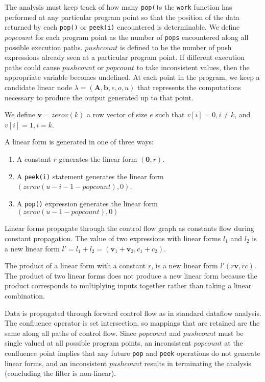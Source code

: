 The analysis must keep track of how many {\tt pop()}s the {\tt work}
function has performed at any particular program point so that the
position of the data returned by each {\tt pop()} or {\tt peek(i)}
encountered is determinable. We define $popcount$ for each program
point as the number of {\tt pops} encountered along all possible
execution paths.  $pushcount$ is defined to be the number of push
expressions already seen at a particular program point.  If different
execution paths could cause $pushcount$ or $popcount$ to take
inconsistent values, then the appropriate variable becomes undefined.
At each point in the program, we keep a candidate linear node
$\lambda=({\mathbf A}, {\mathbf b}, e,o,u)$ that represents the
computations necessary to produce the output generated up to that
point.

We define ${\mathbf v} = zerov(k)$ a row vector of size $e$ such that
$v[i]=0, i \neq k$, and $v[i]=1,i=k$.

A linear form is generated in one of three ways:

\begin{enumerate}
\item A constant $r$ generates the linear form $({\mathbf 0},r)$. 
\vspace{-6pt}

\item A {\tt peek(i)} statement generates the linear form 
$(zerov(u-i-1-popcount), 0)$.
\vspace{-6pt}

\item A {\tt pop()} expression generates the linear form 
$(zerov(u-1-popcount),0)$

\end{enumerate}

Linear forms propagate through the control flow graph as constants
flow during constant propagation. The value of two expressions with
linear forms $l_1$ and $l_2$ is a new linear form
$l'=l_1+l_2=({\mathbf v}_1+{\mathbf v}_2, c_1+c_2)$.

The product of a linear form with a constant $r$, is a new linear form
$l' (r{\mathbf v},rc)$. The product of two linear forms does not
produce a new linear form because the product corresponds to
multiplying inputs together rather than taking a linear combination.

Data is propagated through forward control flow as in standard
dataflow analysis.  The confluence operator is set intersection, so
mappings that are retained are the same along all paths of control
flow. Since $popcount$ and $pushcount$ must be single valued at all
possible program points, an inconsistent $popcount$ at the confluence
point implies that any future {\tt pop} and {\tt peek} operations do
not generate linear forms, and an inconsistent $pushcount$ results in
terminating the analysis (concluding the filter is non-linear).

